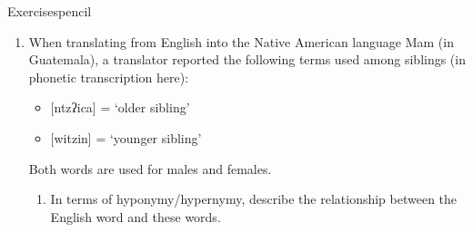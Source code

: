 \begin{tblsfilledsymbol}{Exercises}{pencil}
\begin{enumerate}
The process for encoding is.
\begin{itemize}
\item Lay out a grid with the right number of rows. If you use four rows and your friend uses three, this is not 
going to work.
\item Start at the top of the grid, and fill in cells diagonally downwards, until you reach the
bottom row.
\item Turn around and write diagonally upwards until you get to the top.
\item Keep writing diagonally up-and-down until you run out of message text.
\item Read off the text by rows.
\end{itemize}
Consider the following rail fence message \texttt{TAEIS HRIFN ESAYE LCE}.
\begin{itemize}
\item What does the decoded version of the message say? You might have to try a few different numbers of rows.
\item How many rows are there in the rail fence that worked? 
\item In the noisy channel formulation of the rail fence, we know that the channel model is ``it was corrupted by the railfence cipher''. 
Describe the message model that you used, and how it helped you to decide whether you had solved the problem.
How would this message model need to change if there was a possibility that the sender was from a foreign country?
\end{itemize}

\item    When translating from English into the Native American language Mam
  (in Guatemala), a translator reported the following terms used among
  siblings (in phonetic transcription here):

  \begin{itemize}
  \item{} {[ntzʔica]} = `older     sibling'
  \item{} {[witzin]} = `younger     sibling'
  \end{itemize}
        
  Both words are used for males and females.

  \begin{enumerate}
        
  \item In terms of hyponymy/hypernymy, describe the relationship
    between the English word  and these words.


\end{enumerate}
\end{enumerate}
\end{tblsfilledsymbol}
